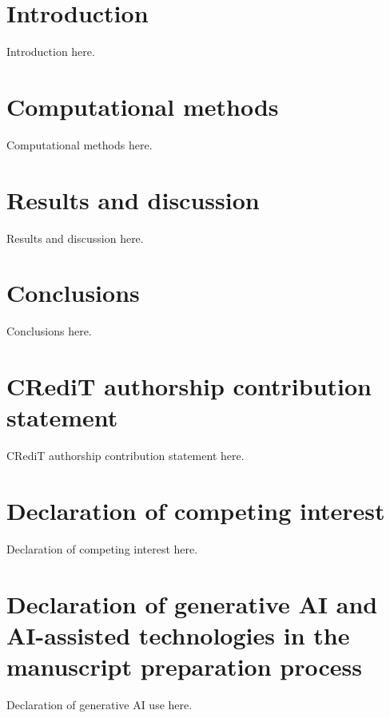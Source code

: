 \documentclass[preprint,12pt]{elsarticle}
\begin{document}
\section{Introduction}
\label{sec:intro}
Introduction here.

\section{Computational methods}
\label{sec:methods}
Computational methods here.

\section{Results and discussion}
\label{sec:results}
Results and discussion here.

\section{Conclusions}
\label{sec:conclusions}
Conclusions here.

\section*{CRediT authorship contribution statement}
CRediT authorship contribution statement here.

\section*{Declaration of competing interest}
Declaration of competing interest here.

\section*{Declaration of generative AI and AI-assisted technologies in the manuscript preparation process}
Declaration of generative AI use here.
\end{document}
